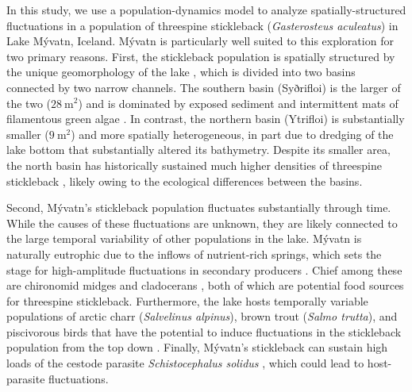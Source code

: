 \documentclass[11pt]{article}
\begin{document}
In this study, 
we use a population-dynamics model to analyze spatially-structured fluctuations 
in a population of threespine stickleback (\emph{Gasterosteus aculeatus})
in Lake M\'{y}vatn, Iceland.
M\'{y}vatn is particularly well suited to this exploration for two primary reasons.
First, the stickleback population is spatially structured by the unique geomorphology
of the lake \citep{gislason1998, millet2013}, 
which is divided into two basins connected by two narrow channels.
The southern basin (Syðrifloi) is the larger of the two ($28~\text{m}^2$) and is dominated
by exposed sediment and intermittent mats of filamentous green algae
\citep{einarsson2004myvatn}.
In contrast, the northern basin (Ytrifloi) is substantially smaller ($9~\text{m}^2$)
and more spatially heterogeneous, 
in part due to dredging of the lake bottom that substantially altered its bathymetry.
Despite its smaller area, the north basin has historically sustained much higher
densities of threespine stickleback  \citep{gislason1998}, 
likely owing to the ecological differences between the basins. 

Second, M\'{y}vatn's stickleback population fluctuates substantially through time.
While the causes of these fluctuations are unknown, 
they are likely connected to the large temporal variability 
of other populations in the lake.
M\'{y}vatn is naturally eutrophic due to the inflows of nutrient-rich springs,
which sets the stage for high-amplitude fluctuations in secondary producers
\citep{einarsson2004myvatn}.
Chief among these are chironomid midges and cladocerans
\citep{einarsson2002, einarsson2004clad, gardarsson2004population, ives2008},
both of which are potential food sources for threespine stickleback.
Furthermore, the lake hosts temporally variable populations 
of arctic charr (\emph{Salvelinus alpinus}), 
brown trout (\emph{Salmo trutta}), 
and piscivorous birds that have the potential 
to induce fluctuations in the stickleback population from the top down
\citep{einarsson2004moulting, gudbergsson2004}.
Finally, M\'{y}vatn's stickleback can sustain high loads of the cestode parasite
\emph{Schistocephalus solidus} \citep{gislason1998, karvonen2013},
which could lead to host-parasite fluctuations.
\end{document}
